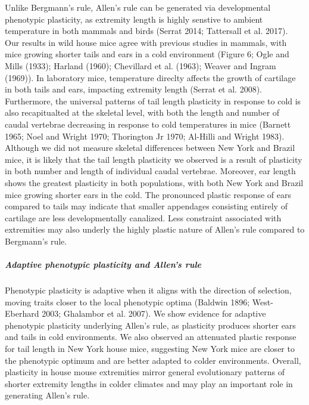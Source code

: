 \documentclass[]{article}
\let\oldsubparagraph\subparagraph
\renewcommand{\subparagraph}[1]{\oldsubparagraph{#1}\mbox{}}
\begin{document}
Unlike Bergmann's rule, Allen's rule can be generated via developmental
phenotypic plasticity, as extremity length is highly senstive to ambient
temperature in both mammals and birds (Serrat 2014; Tattersall et al.
2017). Our results in wild house mice agree with previous studies in
mammals, with mice growing shorter tails and ears in a cold environment
(Figure 6; Ogle and Mills (1933); Harland (1960); Chevillard et al.
(1963); Weaver and Ingram (1969)). In laboratory mice, temperature
direclty affects the growth of cartilage in both tails and ears,
impacting extremity length (Serrat et al. 2008). Furthermore, the
universal patterns of tail length plasticity in response to cold is also
recapitualted at the skeletal level, with both the length and number of
caudal vertebrae decreasing in response to cold temperatures in mice
(Barnett 1965; Noel and Wright 1970; Thorington Jr 1970; Al-Hilli and
Wright 1983). Although we did not measure skeletal differences between
New York and Brazil mice, it is likely that the tail length plasticity
we observed is a result of plasticity in both number and length of
individual caudal vertebrae. Moreover, ear length shows the greatest
plasticity in both populations, with both New York and Brazil mice
growing shorter ears in the cold. The pronounced plastic response of
ears compared to tails may indicate that smaller appendages consisting
entirely of cartilage are less developmentally canalized. Less
constraint associated with extremities may also underly the highly
plastic nature of Allen's rule compared to Bergmann's rule.

\vspace{2.5mm}

\hypertarget{adaptive-phenotypic-plasticity-and-allens-rule}{%
\subparagraph{\texorpdfstring{\emph{Adaptive phenotypic plasticity and
Allen's
rule}}{Adaptive phenotypic plasticity and Allen's rule}}\label{adaptive-phenotypic-plasticity-and-allens-rule}}

Phenotypic plasticity is adaptive when it aligns with the direction of
selection, moving traits closer to the local phenotypic optima (Baldwin
1896; West-Eberhard 2003; Ghalambor et al. 2007). We show evidence for
adaptive phenotypic plasticity underlying Allen's rule, as plasticity
produces shorter ears and tails in cold environments. We also observed
an attenuated plastic response for tail length in New York house mice,
suggesting New York mice are closer to the phenotypic optimum and are
better adapted to colder environments. Overall, plasticity in house
mouse extremities mirror general evolutionary patterns of shorter
extremity lengths in colder climates and may play an important role in
generating Allen's rule.
\end{document}
